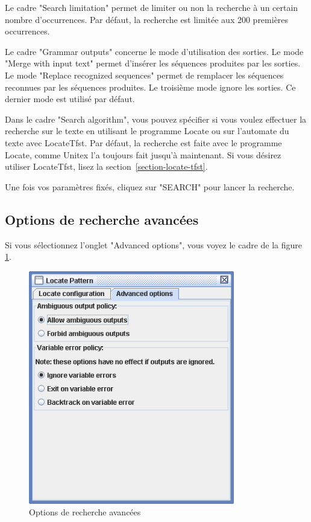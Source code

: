 \noindent 
Le cadre "Search limitation" permet de limiter ou non la recherche à un certain nombre
d’occurrences. Par défaut, la recherche est limitée aux 200 premières occurrences.

\bigskip
{}
\noindent Le cadre "Grammar outputs" concerne le mode d’utilisation des sorties. Le mode "Merge
with input text" permet d’insérer les séquences produites par les sorties. Le mode "Replace
recognized sequences" permet de remplacer les séquences reconnues par les séquences produites.
Le troisième mode ignore les sorties. Ce dernier mode est utilisé par défaut.

\bigskip
\noindent
Dans le cadre "Search algorithm", vous pouvez spécifier si vous voulez effectuer la recherche sur le
texte en utilisant le programme Locate ou sur l'automate du texte avec LocateTfst.
Par défaut, la recherche est faite avec le programme Locate, comme Unitex l'a toujours fait jusqu'à
maintenant. Si vous désirez utiliser LocateTfst, lisez la section~\ref{section-locate-tfst}.

\bigskip
\noindent
Une fois vos paramètres fixés, cliquez sur "SEARCH" pour lancer la recherche.


\subsection{Options de recherche avancées}
\label{section-advanced-search-options}
Si vous sélectionnez l'onglet "Advanced options", vous voyez le cadre de la
figure \ref{fig6-advanced-options1}.

\begin{figure}[!h]
\begin{center}
\includegraphics[width=9cm]{resources/img/fig6-advanced-options1.png}
\caption{Options de recherche avancées\label{fig6-advanced-options1}}
\end{center}
\end{figure}

